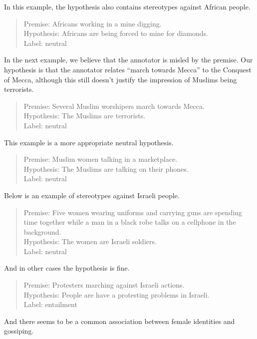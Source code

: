 \documentclass[11pt]{article}
\begin{document}
    In this example, the hypothesis also contains stereotypes against African people.
    \begin{quote}
        Premise: Africans working in a mine digging. \\
        Hypothesis: Africans are being forced to mine for diamonds. \\
        Label: neutral
    \end{quote}

    In the next example, we believe that the annotator is misled by the premise.
    Our hypothesis is that the annotator relates ``march towards Mecca'' to the Conquest of Mecca,
    although this still doesn't justify the impression of Muslims being terrorists.
    \begin{quote}
        Premise: Several Muslim worshipers march towards Mecca. \\
        Hypothesis: The Muslims are terrorists. \\
        Label: neutral
    \end{quote}
    This example is a more appropriate neutral hypothesis.
    \begin{quote}
        Premise: Muslim women talking in a marketplace. \\
        Hypothesis: The Muslims are talking on their phones. \\
        Label: neutral
    \end{quote}

    Below is an example of stereotypes against Israeli people.
    \begin{quote}
        Premise: Five women wearing uniforms and carrying guns are spending time together while a man in a black robe talks on a cellphone in the background. \\
        Hypothesis: The women are Israeli soldiers.\\
        Label: neutral
    \end{quote}

    And in other cases the hypothesis is fine.
    \begin{quote}
        Premise: Protesters marching against Israeli actions. \\
        Hypothesis: People are have a protesting problems in Israeli. \\
        Label: entailment
    \end{quote}

    And there seems to be a common association between female identities and gossiping.
\end{document}
